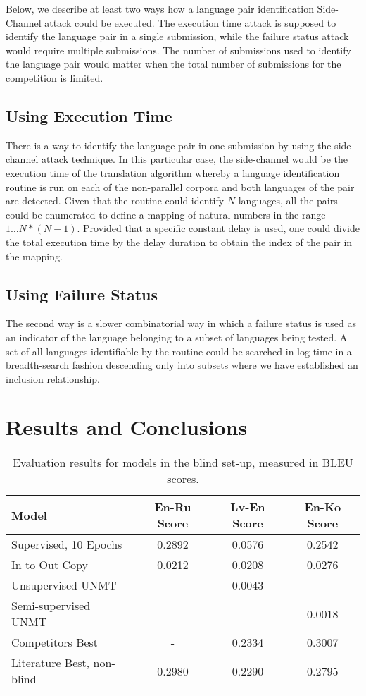 \documentclass[]{article}
\begin{document}
Below, we describe at least two ways how a language pair identification Side-Channel attack could be executed.
The execution time attack is supposed to identify the language pair in a single submission, while the failure status attack would require multiple submissions.
The number of submissions used to identify the language pair would matter when the total number of submissions for the competition is limited.

\subsection{Using Execution Time}
\label{sect:execution_time_attack}

There is a way to identify the language pair in one submission by using the side-channel attack technique.
In this particular case, the side-channel would be the execution time of the translation algorithm whereby a language identification routine is run on each of the non-parallel corpora and both languages of the pair are detected.
Given that the routine could identify $N$ languages, all the pairs could be enumerated to define a mapping of natural numbers in the range $1\dots N*(N-1)$.
Provided that a specific constant delay is used, one could divide the total execution time by the delay duration to obtain the index of the pair in the mapping.

\subsection{Using Failure Status}
\label{sect:failure_status_attack}

The second way is a slower combinatorial way in which a failure status is used as an indicator of the language belonging to a subset of languages being tested.
A set of all languages identifiable by the routine could be searched in log-time in a breadth-search fashion descending only into subsets where we have established an inclusion relationship.

\section{Results and Conclusions}
\label{sect:results}

\begin{table}
\begin{center}
\begin{tabular}{ l c c c }
Model & En-Ru Score & Lv-En Score & En-Ko Score \\
\hline
Supervised, 10 Epochs & 0.2892 & 0.0576 & 0.2542 \\
In to Out Copy & 0.0212 & 0.0208 & 0.0276 \\
Unsupervised UNMT & - & 0.0043 & - \\
Semi-supervised UNMT & - & - & 0.0018 \\
Competitors Best & - & 0.2334 & 0.3007 \\
Literature Best, non-blind & 0.2980 & 0.2290 & 0.2795
\end{tabular}
\end{center}
\caption{Evaluation results for models in the blind set-up, measured in BLEU scores.}
\label{table:results}
\end{table}
\end{document}
